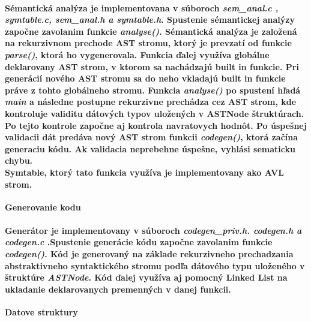 \documentclass[12pt]{article}
\begin{document}
\paragraph{Sémantická analýza je implementovana v súboroch \textit{sem\_anal.c , symtable.c, sem\_anal.h a symtable.h}. Spustenie sémantickej analýzy započne zavolanim funkcie \textit{analyse()}. Sémantická analýza je založená na rekurzivnom prechode AST stromu, ktorý je prevzatí od funkcie \textit{parse()}, ktorá ho vygenerovala. Funkcia ďalej využíva globálne deklarovany AST strom, v ktorom sa nachádzajú built in funkcie. Pri generácií nového AST stromu sa do neho vkladajú built in funkcie práve z tohto globálneho stromu. Funkcia \textit{analyse()} po spustení hľadá \textit{main} a následne postupne rekurzivne prechádza cez AST strom, kde kontroluje validitu dátových typov uložených v ASTNode štruktúrach. Po tejto kontrole započne aj kontrola navratovych hodnôt. Po úspešnej validacii dát predáva nový AST strom funkcii \textit{codegen()}, ktorá začína generaciu kódu. Ak validacia neprebehne úspešne, vyhlási sematicku chybu. \newline \\
Symtable, ktorý tato funkcia využíva je implementovany ako AVL strom.  \newline \\}

 \Large \textbf{Generovanie kodu} \normalsize \\
\noindent\makebox[\linewidth]{\rule{\textwidth}{0.4pt}}

\paragraph{Generátor je implementovany v súboroch \textit{codegen\_priv.h. codegen.h a codegen.c }.Spustenie generácie kódu započne zavolanim funkcie \textit{codegen()}. Kód je generovaný na základe rekurzivneho prechadzania abstraktivneho syntaktického stromu podľa dátového typu uloženého v štruktúre \textit{ASTNode}. Kód ďalej využíva aj pomocný Linked List na ukladanie deklarovanych premenných v danej funkcii. \newline \\}

\newpage

 \Large \textbf{Datove struktury}\normalsize \\
\noindent\makebox[\linewidth]{\rule{\textwidth}{0.4pt}}
\end{document}
